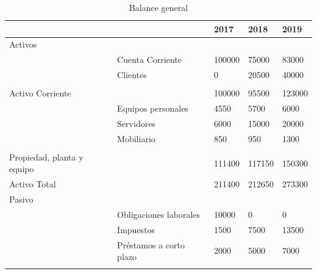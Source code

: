 \documentclass[11pt,leqno]{article}
\begin{document}
\begin{table}[H]
\centering
\caption{Balance general}
\label{BG}%
\begin{tabular}{@{}lllll@{}}
\toprule
                           &                                   & 2017   & 2018   & 2019   \\ \midrule
Activos                    &                                   &        &        &        \\ \midrule
                           & Cuenta Corriente                  & 100000 & 75000  & 83000  \\
                           & Clientes                          & 0      & 20500  & 40000  \\
                           &                                   &        &        &        \\
Activo Corriente           &                                   & 100000 & 95500  & 123000 \\ \midrule
                           & Equipos personales                & 4550   & 5700   & 6000   \\
                           & Servidores                        & 6000   & 15000  & 20000  \\
                           & Mobiliario                        & 850    & 950    & 1300   \\
                           &                                   &        &        &        \\
Propiedad, planta y equipo &                                   & 111400 & 117150 & 150300 \\ \midrule
Activo Total               &                                   & 211400 & 212650 & 273300 \\ \midrule
Pasivo                     &                                   &        &        &        \\ \midrule
                           & Obligaciones laborales            & 10000  & 0      & 0      \\
                           & Impuestos                         & 1500   & 7500   & 13500  \\
                           & Préstamos a corto plazo           & 2000   & 5000   & 7000   \\
                           &                                   &        &        &        \\

\end{tabular}
\end{table}
\end{document}
